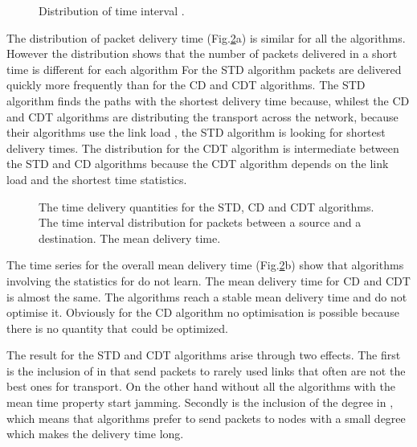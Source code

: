 \documentclass[runningheads]{llncs}
\begin{document}
\begin{figure}[htb]
 \centering
 \centerline{}
  \caption[TIDdt]{Distribution of time interval .}
  \label{TIDdt}
\end{figure}

The distribution of packet delivery time (Fig.\ref{TimeProp}a) is
similar for all the algorithms. However the distribution shows that
the number of packets delivered in a short time is different for
each algorithm For the STD algorithm packets are delivered quickly
more frequently than for the CD and CDT algorithms. The STD
algorithm finds the paths with the shortest delivery time because,
whilest the CD and CDT algorithms are distributing the transport
across the network, because their algorithms use the link load
, the STD algorithm is looking for shortest delivery times.
The distribution for the CDT algorithm is intermediate between the
STD and CD algorithms because the CDT algorithm depends on the link
load  and the shortest time statistics.
\begin{figure}
\centerline{} \caption{The time
delivery quantities for the STD, CD and CDT algorithms.  The
time interval distribution for packets between a source and a
destination.  The mean delivery time.} \label{TimeProp}
\end{figure}

The time series for the overall mean delivery time
(Fig.\ref{TimeProp}b) show that algorithms involving the statistics
for  do not learn. The mean delivery time for CD and
CDT is almost the same. The algorithms reach a stable mean delivery
time and do not optimise it. Obviously for the CD algorithm no
optimisation is possible because there is no quantity that could be
optimized.

The result for the STD and CDT algorithms arise through two effects.
The first is the inclusion of  in  that send packets
to rarely used links that often are not the best ones for transport.
On the other hand without  all the algorithms with the
mean time property start jamming. Secondly is the inclusion of the
degree in , which means that algorithms prefer to send packets to
nodes with a small degree which makes the delivery time long.
\end{document}
